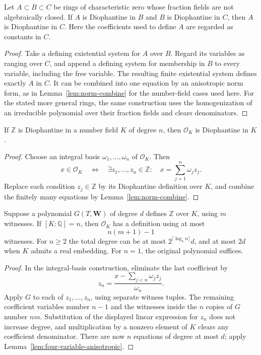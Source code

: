 \begin{lemma}[Transitivity]\label{lem:diophantine-transitivity-nf}
Let $A\subset B\subset C$ be rings of characteristic zero whose
fraction fields are not algebraically closed.  If $A$ is Diophantine in
$B$ and $B$ is Diophantine in $C$, then $A$ is Diophantine in $C$.
Here the coefficients used to define $A$ are regarded as constants in $C$.
\end{lemma}
\begin{proof}
Take a defining existential system for $A$ over $B$.  Regard its
variables as ranging over $C$, and append a defining system for
membership in $B$ to every variable, including the free variable.
The resulting finite existential system defines exactly $A$ in $C$.
It can be combined into one equation by an anisotropic norm form,
as in Lemma~\ref{lem:norm-combine} for the number-field cases used here.
For the stated more general rings, the same construction uses the
homogenization of an irreducible polynomial over their fraction fields
and clears denominators.
\end{proof}

\begin{proposition}\label{prop:integral-basis-transfer}
If $\mathbb Z$ is Diophantine in a number field $K$ of degree $n$, then
$\mathcal O_K$ is Diophantine in $K$.
\end{proposition}
\begin{proof}
Choose an integral basis $\omega_1,\ldots,\omega_n$ of $\mathcal O_K$.
Then
\[
 x\in\mathcal O_K\quad\Longleftrightarrow\quad
 \exists z_1,\ldots,z_n\in\mathbb Z:\quad
 x=\sum_{j=1}^n\omega_jz_j.
\]
Replace each condition $z_j\in\mathbb Z$ by its Diophantine
definition over $K$, and combine the finitely many equations by
Lemma~\ref{lem:norm-combine}.
\end{proof}

\begin{proposition}
\label{prop:quantitative-integral-basis}
Suppose a polynomial $G(T,\mathbf W)$ of degree $d$ defines
$\mathbb Z$ over $K$, using $m$ witnesses.  If $[K:\mathbb Q]=n$,
then $\mathcal O_K$ has a definition using at most
\[
 n(m+1)-1
\]
witnesses.  For $n\geq2$ the total degree can be at most
$2^{\lceil\log_4 n\rceil}d$, and at most $2d$ when $K$ admits a
real embedding.  For $n=1$, the original polynomial suffices.
\end{proposition}
\begin{proof}
In the integral-basis construction, eliminate the last coefficient by
\[
 z_n=\frac{x-\sum_{j<n}\omega_j z_j}{\omega_n}.
\]
Apply $G$ to each of $z_1,\ldots,z_n$, using separate witness tuples.
The remaining coefficient variables number $n-1$ and the witnesses
inside the $n$ copies of $G$ number $nm$.  Substitution of the displayed
linear expression for $z_n$ does not increase degree, and multiplication
by a nonzero element of $K$ clears any coefficient denominator.  There
are now $n$ equations of degree at most $d$; apply
Lemma~\ref{lem:four-variable-anisotropic}.
\end{proof}

